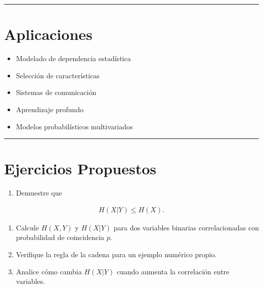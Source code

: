 \documentclass[letterpaper,10pt,english]{jupyterBook}
\begin{document}
\bigskip\hrule\bigskip



\section{Aplicaciones}
\label{\detokenize{01_theory/conditional_entropy:aplicaciones}}\begin{itemize}
\item {} 
\sphinxAtStartPar
Modelado de dependencia estadística

\item {} 
\sphinxAtStartPar
Selección de características

\item {} 
\sphinxAtStartPar
Sistemas de comunicación

\item {} 
\sphinxAtStartPar
Aprendizaje profundo

\item {} 
\sphinxAtStartPar
Modelos probabilísticos multivariados

\end{itemize}


\bigskip\hrule\bigskip



\section{Ejercicios Propuestos}
\label{\detokenize{01_theory/conditional_entropy:ejercicios-propuestos}}\begin{enumerate}
%
\item {} 
\sphinxAtStartPar
Demuestre que

\end{enumerate}
\begin{equation*}
\begin{split}
H(X|Y)\le H(X).
\end{split}
\end{equation*}\begin{enumerate}
%
\setcounter{enumi}{1}
\item {} 
\sphinxAtStartPar
Calcule \(H(X,Y)\) y \(H(X|Y)\) para dos variables binarias correlacionadas
con probabilidad de coincidencia \(p\).

\item {} 
\sphinxAtStartPar
Verifique la regla de la cadena para un ejemplo numérico propio.

\item {} 
\sphinxAtStartPar
Analice cómo cambia \(H(X|Y)\) cuando aumenta la correlación entre variables.

\end{enumerate}
\end{document}
